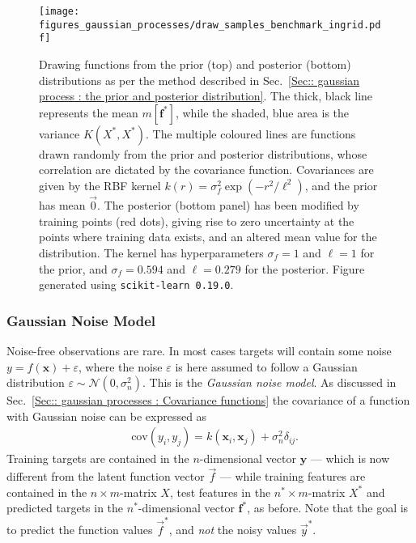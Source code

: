 \documentclass[twoside,english]{uiofysmaster}
\begin{document}
{{\begin{figure}
\centering
\texttt{[image: figures\_gaussian\_processes/draw\_samples\_benchmark\_ingrid.pdf]}
\caption{Drawing functions from the prior (top) and posterior (bottom) distributions as per the method described in Sec.~\ref{Sec:: gaussian process : the prior and posterior distribution}. The thick, black line represents the mean $m[\textbf{f}^*]$, while the shaded, blue area is the variance $K(X^*, X^*)$. The multiple coloured lines are functions drawn randomly from the prior and posterior distributions, whose correlation are dictated by the covariance function. Covariances are given by the RBF kernel $k(r) = \sigma_f^2 \exp(-r^2/\ell^2)$, and the prior has mean $\vec{0}$. The posterior (bottom panel) has been modified by training points (red dots), giving rise to zero uncertainty at the points where training data exists, and an altered mean value for the distribution. The kernel has hyperparameters $\sigma_f = 1$ and $\ell = 1$ for the prior, and $\sigma_f = 0.594$ and $\ell = 0.279$ for the posterior. Figure generated using {\tt scikit-learn 0.19.0}.}
\label{Fig:: gaussian process : prior posterior drawn samples}
\end{figure}

\subsubsection{Gaussian Noise Model}\label{Sec: gaussian process : Gaussian Noise Model}

Noise-free observations are rare. In most cases targets will contain some noise $y = f(\textbf{x}) + \varepsilon$, where the noise $\varepsilon$ is here assumed to follow a Gaussian distribution $\varepsilon \sim \mathcal{N}(0, \sigma_n^2)$. This is the \textit{Gaussian noise model}. As discussed in Sec.~\ref{Sec:: gaussian processes : Covariance functions} the covariance of a function with Gaussian noise can be expressed as
\begin{align}
&\text{cov}(y_i, y_j) = k(\textbf{x}_i, \textbf{x}_j) + \sigma_n^2 \delta_{ij}.
\end{align}
Training targets are contained in the $n$-dimensional vector $\textbf{y}$ --- which is now different from the latent function vector $\vec{f}$ --- while training features are contained in the $n \times m$-matrix $X$, test features in the $n^* \times m$-matrix $X^*$ and predicted targets in the $n^*$-dimensional vector $\textbf{f}^*$, as before. Note that the goal is to predict the function values $\vec{f}^*$, and \textit{not} the noisy values $\vec{y}^*$. 

}}
\end{document}
